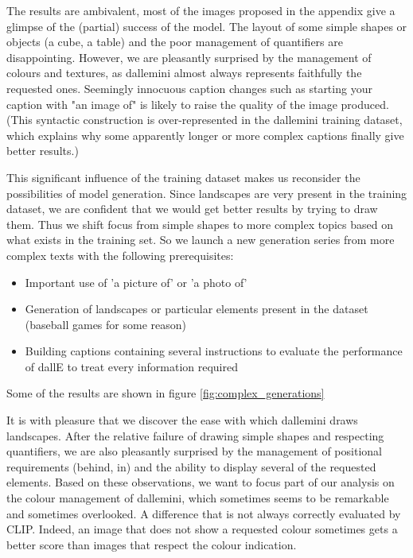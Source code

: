\documentclass{article}
\begin{document}
\begin{multicols}{2}
The results are ambivalent, most of the images proposed in the appendix give a glimpse of the (partial) success of the model. The layout of some simple shapes or objects (a cube, a table) and the poor management of quantifiers are disappointing.
However, we are pleasantly surprised by the management of colours and textures, as \gls{dallemini} almost always represents faithfully the requested ones.
Seemingly innocuous caption changes such as starting your caption with "an image of" is likely to raise the quality of the image produced.
(This syntactic construction is over-represented in the \gls{dallemini} training dataset, which explains why some apparently longer or more complex captions finally give better results.)

This significant influence of the training dataset makes us reconsider the possibilities of model generation. Since landscapes are very present in the training dataset, we are confident that we would get better results by trying to draw them.
Thus we shift focus from simple shapes to more complex topics based on what exists in the training set.
So we launch a new generation series from more complex texts with the following prerequisites:
\begin{itemize}
    \item Important use of 'a picture of' or 'a photo of'
    \item Generation of landscapes or particular elements present in the dataset (baseball games for some reason)
    \item Building captions containing several instructions to evaluate the performance of dallE to treat every information required
\end{itemize}

Some of the results are shown in figure \ref{fig:complex_generations}

It is with pleasure that we discover the ease with which \gls{dallemini} draws landscapes. After the relative failure of drawing simple shapes and respecting quantifiers, we are also pleasantly surprised by the management of positional requirements (behind, in) and the ability to display several of the requested elements. Based on these observations, we want to focus part of our analysis on the colour management of \gls{dallemini}, which sometimes seems to be remarkable and sometimes overlooked. A difference that is not always correctly evaluated by CLIP. Indeed, an image that does not show a requested colour sometimes gets a better score than images that respect the colour indication.


\end{multicols}
\end{document}
